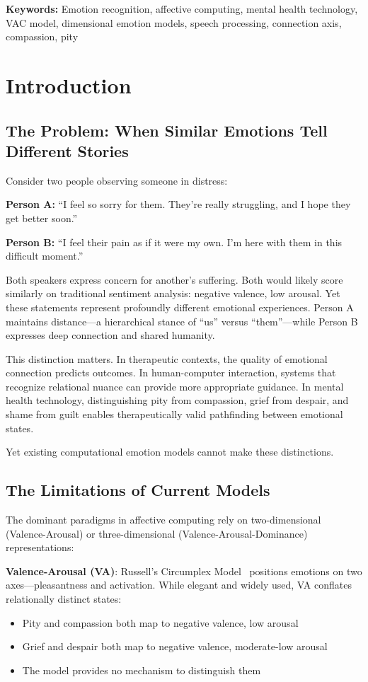\documentclass[10pt,twocolumn]{article}
\begin{document}
\noindent
\textbf{Keywords:} Emotion recognition, affective computing, mental health technology, VAC model, dimensional emotion models, speech processing, connection axis, compassion, pity

\section{Introduction}
\label{sec:introduction}
\subsection{The Problem: When Similar Emotions Tell Different Stories}

Consider two people observing someone in distress:

\textbf{Person A:} ``I feel so sorry for them. They're really struggling, and I hope they get better soon.''

\textbf{Person B:} ``I feel their pain as if it were my own. I'm here with them in this difficult moment.''

Both speakers express concern for another's suffering. Both would likely score similarly on traditional sentiment analysis: negative valence, low arousal. Yet these statements represent profoundly different emotional experiences. Person A maintains distance—a hierarchical stance of ``us'' versus ``them''—while Person B expresses deep connection and shared humanity.

This distinction matters. In therapeutic contexts, the quality of emotional connection predicts outcomes. In human-computer interaction, systems that recognize relational nuance can provide more appropriate guidance. In mental health technology, distinguishing pity from compassion, grief from despair, and shame from guilt enables therapeutically valid pathfinding between emotional states.

Yet existing computational emotion models cannot make these distinctions.

\subsection{The Limitations of Current Models}

The dominant paradigms in affective computing rely on two-dimensional (Valence-Arousal) or three-dimensional (Valence-Arousal-Dominance) representations:

\textbf{Valence-Arousal (VA)}: Russell's Circumplex Model~\cite{russell1980} positions emotions on two axes—pleasantness and activation. While elegant and widely used, VA conflates relationally distinct states:
\begin{itemize}
    \item Pity and compassion both map to negative valence, low arousal
    \item Grief and despair both map to negative valence, moderate-low arousal
    \item The model provides no mechanism to distinguish them
\end{itemize}
\end{document}
